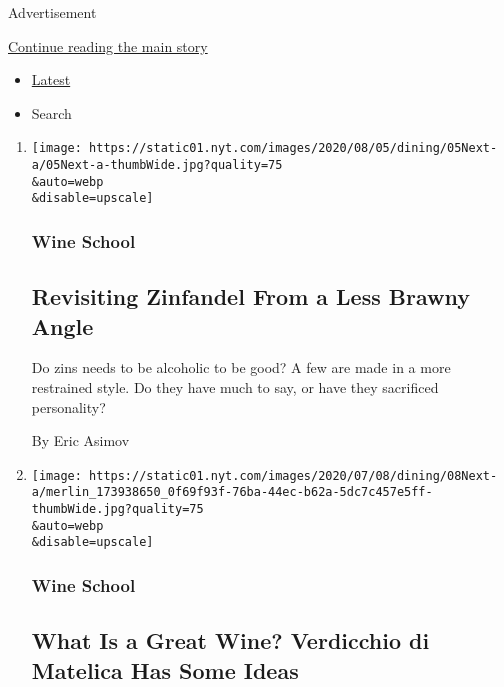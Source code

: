 Advertisement

\protect\hyperlink{after-mid1}{Continue reading the main story}

\begin{itemize}
\tightlist
\item
  \protect\hyperlink{stream-panel}{Latest}
\item
  Search
\end{itemize}

\begin{enumerate}
\def\labelenumi{\arabic{enumi}.}
\item
  \href{/2020/07/30/dining/drinks/wine-school-assignment-zinfandel.html}{}

  \texttt{[image: https://static01.nyt.com/images/2020/08/05/dining/05Next-a/05Next-a-thumbWide.jpg?quality=75\\\&auto=webp\\\&disable=upscale]}

  \hypertarget{wine-school-2}{%
  \subsubsection{Wine School}\label{wine-school-2}}

  \hypertarget{revisiting-zinfandel-from-a-less-brawny-angle}{%
  \subsection{Revisiting Zinfandel From a Less Brawny
  Angle}\label{revisiting-zinfandel-from-a-less-brawny-angle}}

  Do zins needs to be alcoholic to be good? A few are made in a more
  restrained style. Do they have much to say, or have they sacrificed
  personality?

  By Eric Asimov
\item
  \href{/2020/07/30/dining/drinks/wine-school-verdicchio-di-matelica.html}{}

  \texttt{[image: https://static01.nyt.com/images/2020/07/08/dining/08Next-a/merlin\_173938650\_0f69f93f-76ba-44ec-b62a-5dc7c457e5ff-thumbWide.jpg?quality=75\\\&auto=webp\\\&disable=upscale]}

  \hypertarget{wine-school-3}{%
  \subsubsection{Wine School}\label{wine-school-3}}

  \hypertarget{what-is-a-great-wine-verdicchio-di-matelica-has-some-ideas}{%
  \subsection{What Is a Great Wine? Verdicchio di Matelica Has Some
  Ideas}\label{what-is-a-great-wine-verdicchio-di-matelica-has-some-ideas}}


\end{enumerate}
